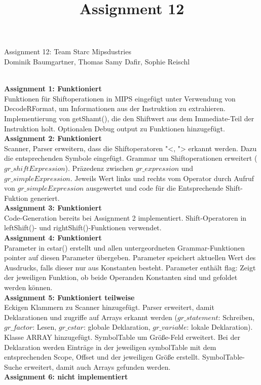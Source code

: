 \documentclass[10pt, a4paper]{article}
\title{Assignment 12}
\author{}
\date{}
\begin{document}
\begin{center}
	Assignment 12: Team Starc Mipsdustries\\
	Dominik Baumgartner, Thomas Samy Dafir, Sophie Reischl
\end{center}	

\ \\
\textbf{Assignment 1: Funktioniert}\\
Funktionen für Shiftoperationen in MIPS eingefügt unter Verwendung von DecodeRFormat, um Informationen aus der Instruktion zu extrahieren. Implementierung von getShamt(), die den Shiftwert aus dem Immediate-Teil der Instruktion holt. Optionalen Debug output zu Funktionen hinzugefügt.
\ \\ 
\textbf{Assignment 2: Funktioniert}\\
Scanner, Parser erweitern, dass die Shiftoperatoren "<, "> erkannt werden. Dazu die entsprechenden Symbole eingefügt. Grammar um Shiftoperationen erweitert ($gr\_shiftExpression$). Präzedenz zwischen $gr\_expression$ und $gr\_simpleExpression$. Jeweils Wert links und rechts vom Operator durch Aufruf von $gr\_simpleExpression$ ausgewertet und code für die Entsprechende Shift-Fuktion generiert. 
\ \\
\textbf{Assignment 3: Funktioniert}\\
Code-Generation bereits bei Assignment 2 implementiert.
Shift-Operatoren in leftShift()- und rightShift()-Funktionen verwendet.
\\
\textbf{Assignment 4: Funktioniert}\\
Parameter in cstar() erstellt und allen untergeordneten Grammar-Funktionen pointer auf diesen Parameter übergeben. Parameter speichert aktuellen Wert des Ausdrucks, falls dieser nur aus Konstanten besteht. Parameter enthält flag: Zeigt der jeweiligen Funktion, ob beide Operanden Konstanten sind und gefoldet werden können.
\\
\textbf{Assignment 5: Funktioniert teilweise}\\
Eckigen Klammern zu Scanner hinzugefügt. Parser erweitert, damit Deklarationen und zugriffe auf Arrays erkannt werden ($gr\_statement$: Schreiben, $gr\_factor$: Lesen, $gr\_cstar$: globale Deklaration, $gr\_variable$: lokale Deklaration). Klasse ARRAY hinzugefügt. SymbolTable um Größe-Feld erweitert. Bei der Deklaration werden Einträge in der jeweiligen symbolTable mit dem entsprechenden Scope, Offset und der jeweiligen Größe erstellt. SymbolTable-Suche erweitert, damit auch Arrays gefunden werden.
\\
\textbf{Assignment 6: nicht implementiert}\\
\end{document}
